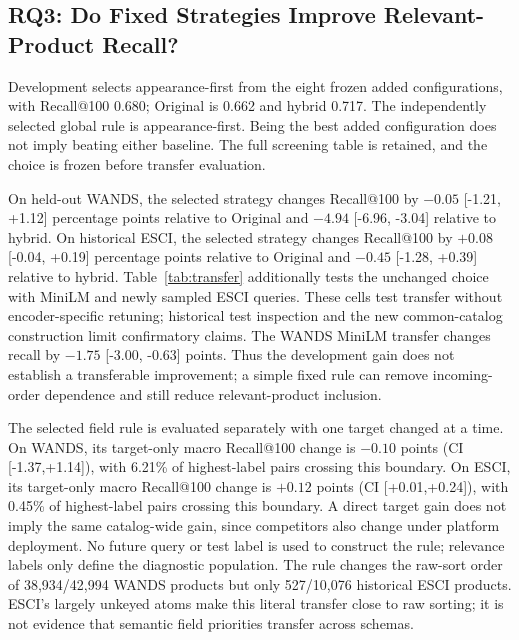 \subsection{RQ3: Do Fixed Strategies Improve Relevant-Product Recall?}
Development selects appearance-first from the eight frozen added configurations, with Recall@100 0.680; Original is 0.662 and hybrid 0.717. The independently selected global rule is appearance-first. Being the best added configuration does not imply beating either baseline. The full screening table is retained, and the choice is frozen before transfer evaluation.



On held-out WANDS, the selected strategy changes Recall@100 by $-0.05$ [-1.21, +1.12] percentage points relative to Original and $-4.94$ [-6.96, -3.04] relative to hybrid. On historical ESCI, the selected strategy changes Recall@100 by $+0.08$ [-0.04, +0.19] percentage points relative to Original and $-0.45$ [-1.28, +0.39] relative to hybrid. Table~\ref{tab:transfer} additionally tests the unchanged choice with MiniLM and newly sampled ESCI queries. These cells test transfer without encoder-specific retuning; historical test inspection and the new common-catalog construction limit confirmatory claims. The WANDS MiniLM transfer changes recall by $-1.75$ [-3.00, -0.63] points. Thus the development gain does not establish a transferable improvement; a simple fixed rule can remove incoming-order dependence and still reduce relevant-product inclusion.

The selected field rule is evaluated separately with one target changed at a time. On WANDS, its target-only macro Recall@100 change is $-0.10$ points (CI [-1.37,+1.14]), with 6.21\% of highest-label pairs crossing this boundary. On ESCI, its target-only macro Recall@100 change is $+0.12$ points (CI [+0.01,+0.24]), with 0.45\% of highest-label pairs crossing this boundary. A direct target gain does not imply the same catalog-wide gain, since competitors also change under platform deployment. No future query or test label is used to construct the rule; relevance labels only define the diagnostic population. The rule changes the raw-sort order of 38,934/42,994 WANDS products but only 527/10,076 historical ESCI products. ESCI's largely unkeyed atoms make this literal transfer close to raw sorting; it is not evidence that semantic field priorities transfer across schemas.

